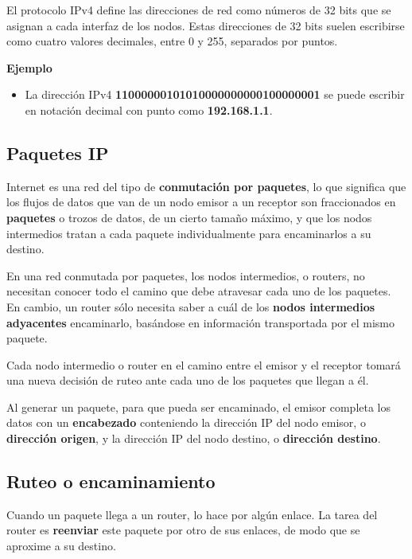 \documentclass[spanish,a4paper,]{article}
\providecommand{\tightlist}{%
  \setlength{\itemsep}{0pt}\setlength{\parskip}{0pt}}
\begin{document}
El protocolo IPv4 define las direcciones de red como números de 32 bits
que se asignan a cada interfaz de los nodos. Estas direcciones de 32
bits suelen escribirse como cuatro valores decimales, entre 0 y 255,
separados por puntos.

\textbf{Ejemplo}

\begin{itemize}
\tightlist
\item
  La dirección IPv4 \textbf{11000000101010000000000100000001} se puede
  escribir en notación decimal con punto como \textbf{192.168.1.1}.
\end{itemize}

\hypertarget{paquetes-ip}{%
\subsection{Paquetes IP}\label{paquetes-ip}}

Internet es una red del tipo de \textbf{conmutación por paquetes}, lo
que significa que los flujos de datos que van de un nodo emisor a un
receptor son fraccionados en \textbf{paquetes} o trozos de datos, de un
cierto tamaño máximo, y que los nodos intermedios tratan a cada paquete
individualmente para encaminarlos a su destino.

En una red conmutada por paquetes, los nodos intermedios, o routers, no
necesitan conocer todo el camino que debe atravesar cada uno de los
paquetes. En cambio, un router sólo necesita saber a cuál de los
\textbf{nodos intermedios adyacentes} encaminarlo, basándose en
información transportada por el mismo paquete.

Cada nodo intermedio o router en el camino entre el emisor y el receptor
tomará una nueva decisión de ruteo ante cada uno de los paquetes que
llegan a él.

Al generar un paquete, para que pueda ser encaminado, el emisor completa
los datos con un \textbf{encabezado} conteniendo la dirección IP del
nodo emisor, o \textbf{dirección origen}, y la dirección IP del nodo
destino, o \textbf{dirección destino}.

\hypertarget{ruteo-o-encaminamiento}{%
\subsection{Ruteo o encaminamiento}\label{ruteo-o-encaminamiento}}

Cuando un paquete llega a un router, lo hace por algún enlace. La tarea
del router es \textbf{reenviar} este paquete por otro de sus enlaces, de
modo que se aproxime a su destino.
\end{document}
